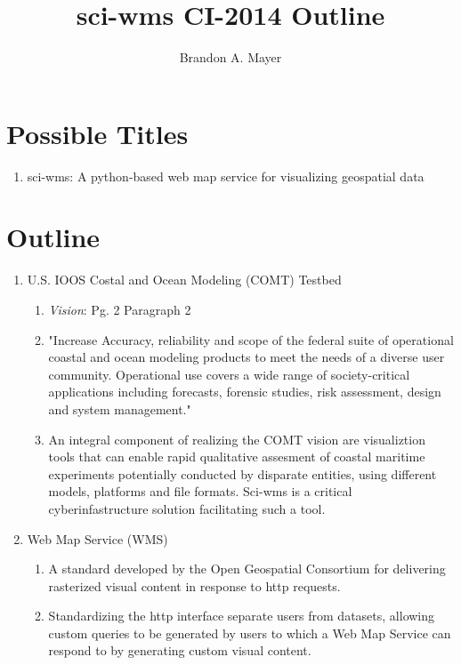 \documentclass{article}
\author{Brandon A. Mayer}
\title{sci-wms CI-2014 Outline}
\date{}
\begin{document}
\maketitle
\section{Possible Titles}
\begin{enumerate}
  \item sci-wms: A python-based web map service for visualizing geospatial data
\end{enumerate}

\section{Outline}
\begin{enumerate}
  \item U.S. IOOS Costal and Ocean Modeling (COMT) Testbed~\cite{luettich13}
    \begin{enumerate}[label*=\arabic*.]\
      \item {\em Vision}: Pg. 2 Paragraph 2
      \item "Increase Accuracy, reliability and scope of the federal
        suite of operational coastal and ocean modeling products to
        meet the needs of a diverse user community. Operational use
        covers a wide range of society-critical applications including
        forecasts, forensic studies, risk assessment, design and system
        management."
      \item An integral component of realizing the COMT vision are
        visualiztion tools that can enable rapid qualitative assesment
        of coastal maritime experiments potentially conducted by
        disparate entities, using different models, platforms and file
        formats. Sci-wms is a critical cyberinfastructure solution facilitating such a tool.
    \end{enumerate}

  \item Web Map Service (WMS)~\cite{wms14}
    \begin{enumerate}[label*=\arabic*.]
      \item A standard developed by the Open Geospatial Consortium for
        delivering rasterized visual content in response to http
        requests.
      \item Standardizing the http interface separate users from
        datasets, allowing custom queries to be generated by users to
        which a Web Map Service can respond to by generating custom
        visual content.
    \end{enumerate}


\end{enumerate}
\end{document}
